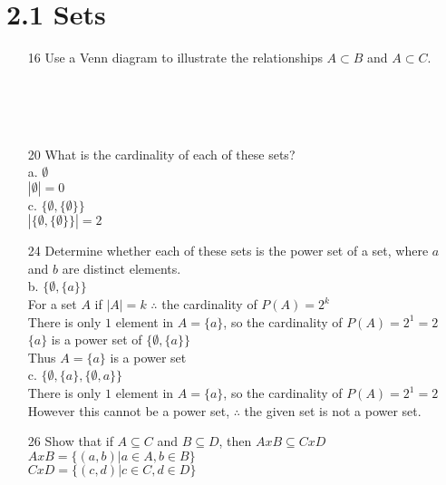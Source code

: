 \documentclass[a4paper]{article}
\newcommand\tab[1][0.5cm]{\hspace*{#1}}
\def\firstcircle{(0:1cm) circle (1cm)}
\def\secondcircle{(180:2.5cm) circle (2.5cm)}
\def\thirdcircle{(0:2.5cm) circle (2.5cm)}
\begin{document}
\section{2.1 Sets}
\begin{itemize}
  \item[16] Use a Venn diagram to illustrate the relationships $A \subset B$ and $A \subset C$. \\ \\
   \\ \\
  \item[20] What is the cardinality of each of these sets? \\
    a. $\emptyset$ \\
    \tab $|\emptyset| = 0$ \\
    c. $\{ \emptyset, \{\emptyset\}\}$ \\
    \tab $|\{\emptyset, \{\emptyset\}\}| = 2$
  \item[24] Determine whether each of these sets is the power set of a set, where $a$ and $b$ are distinct elements. \\
    b. $\{\emptyset, \{a\}\}$ \\
    \tab For a set $A$ if $|A| = k$ $\therefore$ the cardinality of $P(A) = 2^k$ \\
    \tab There is only $1$ element in $A = \{a\}$, so the cardinality of $P(A) = 2^1 = 2$ \\
    \tab $\{a\}$ is a power set of $\{\emptyset, \{a\}\}$ \\
    \tab Thus $A = \{a\}$ is a power set \\
    c. $\{\emptyset, \{a\}, \{\emptyset, a\}\}$ \\
    \tab There is only $1$ element in $A = \{a\}$, so the cardinality of $P(A) = 2^1 = 2$ \\
    \tab However this cannot be a power set, $\therefore$ the given set is not a power set.
  \item[26] Show that if $A \subseteq C$ and $B \subseteq D$, then $A x B \subseteq C x D$ \\
  \tab $A x B = \{(a, b)|a \in A, b \in B\}$ \\
  \tab $C x D = \{(c, d)|c \in C, d \in D\}$ \\

\end{itemize}
\end{document}
